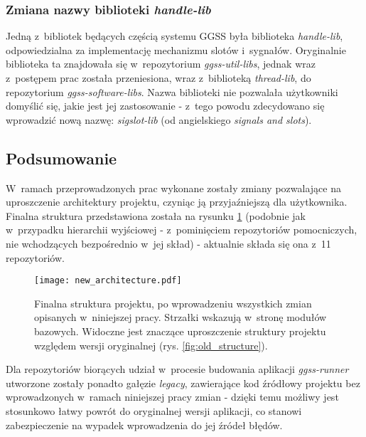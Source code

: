 \subsubsection{Zmiana nazwy biblioteki \emph{handle-lib}}
Jedną z~bibliotek będących częścią systemu GGSS była biblioteka \emph{handle-lib}, odpowiedzialna za implementację mechanizmu slotów i~sygnałów. Oryginalnie biblioteka ta znajdowała się w~repozytorium \emph{ggss-util-libs}, jednak wraz z~postępem prac została przeniesiona, wraz z~biblioteką \emph{thread-lib}, do repozytorium \emph{ggss-software-libs}. Nazwa biblioteki nie pozwalała użytkowniki domyślić się, jakie jest jej zastosowanie - z~tego powodu zdecydowano się wprowadzić nową nazwę: \emph{sigslot-lib} (od angielskiego \emph{signals and slots}).


\subsection{Podsumowanie}
W~ramach przeprowadzonych prac wykonane zostały zmiany pozwalające na uproszczenie architektury projektu, czyniąc ją przyjaźniejszą dla użytkownika. Finalna struktura przedstawiona została na rysunku \ref{fig:new_architecture} (podobnie jak w~przypadku hierarchii wyjściowej - z~pominięciem repozytoriów pomocniczych, nie wchodzących bezpośrednio w~jej skład) - aktualnie składa się ona z~11 repozytoriów.

\begin{figure}[H]
\centering
\texttt{[image: new\_architecture.pdf]}
\caption{Finalna struktura projektu, po wprowadzeniu wszystkich zmian opisanych w~niniejszej pracy. Strzałki wskazują w~stronę modułów bazowych. Widoczne jest znaczące uproszczenie struktury projektu względem wersji oryginalnej (rys. \ref{fig:old_structure}).}
\label{fig:new_architecture}
\end{figure}

Dla repozytoriów biorących udział w~procesie budowania aplikacji \emph{ggss-runner} utworzone zostały ponadto gałęzie \emph{legacy}, zawierające kod źródłowy projektu bez wprowadzonych w~ramach niniejszej pracy zmian - dzięki temu możliwy jest stosunkowo łatwy powrót do oryginalnej wersji aplikacji, co stanowi zabezpieczenie na wypadek wprowadzenia do jej źródeł błędów.